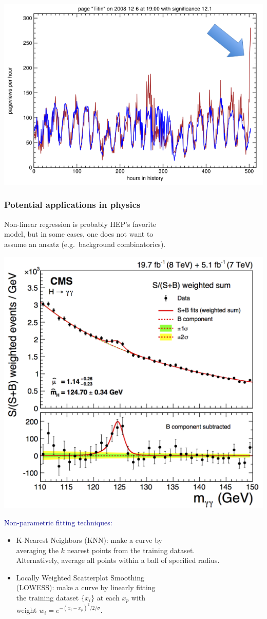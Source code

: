 \documentclass[compress]{beamer}
\begin{document}
\begin{frame}
\vspace{-3.2 cm}
\hfill \includegraphics[width=0.5\linewidth]{PLOTS/holt-winters.png}
\end{frame}

\begin{frame}
\frametitle{Potential applications in physics}

\vspace{0.2 cm}
Non-linear regression is probably HEP's favorite \\ model, but in some cases, one does not want to \\ assume an ansatz (e.g.\ background combinatorics).

\vspace{-1.3 cm}
\hfill \includegraphics[width=0.28\linewidth]{PLOTS/higgs_gamma_gamma.png}

\vspace{-1.3 cm}
\textcolor{darkblue}{Non-parametric fitting techniques:}

\begin{itemize}

\item K-Nearest Neighbors (KNN): make a curve by \\ averaging the $k$ nearest points from the training dataset. \\ Alternatively, average all points within a ball of specified radius.

\item Locally Weighted Scatterplot Smoothing \\ (LOWESS): make a curve by linearly fitting \\ the training dataset $\{x_i\}$ at each $x_p$ with \\ weight $w_i = e^{-(x_i - x_p)^2/2/\sigma}$.


\end{itemize}
\end{frame}
\end{document}
